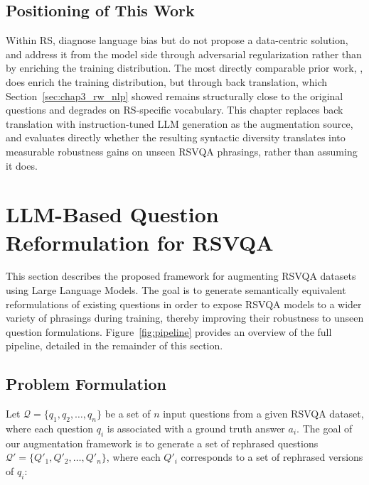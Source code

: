 \subsection{Positioning of This Work}
\label{sec:chap3_positioning}
 
Within RS, \textcite{chappuis2025langbias} diagnose language bias but do not propose a data-centric solution, and \textcite{yuan2023adversarial} address it from the model side through adversarial regularization rather than by enriching the training distribution. The most directly comparable prior work, \textcite{yuan2023multilingual}, does enrich the training distribution, but through back translation, which Section~\ref{sec:chap3_rw_nlp} showed remains structurally close to the original questions and degrades on RS-specific vocabulary. This chapter replaces back translation with instruction-tuned LLM generation as the augmentation source, and evaluates directly whether the resulting syntactic diversity translates into measurable robustness gains on unseen RSVQA phrasings, rather than assuming it does.

\section{LLM-Based Question Reformulation for RSVQA}
\label{sec:chap3_method}
 
This section describes the proposed framework for
augmenting RSVQA datasets using Large Language Models.
The goal is to generate semantically equivalent
reformulations of existing questions in order to expose
RSVQA models to a wider variety of phrasings during
training, thereby improving their robustness to unseen
question formulations. Figure~\ref{fig:pipeline} provides
an overview of the full pipeline, detailed in the
remainder of this section.
 
\subsection{Problem Formulation}
\label{sec:chap3_formulation}
 
Let $\mathcal{Q} = \{q_1, q_2, \ldots, q_n\}$ be a set
of $n$ input questions from a given RSVQA dataset, where
each question $q_i$ is associated with a ground truth
answer $a_i$. The goal of our augmentation framework is
to generate a set of rephrased questions
$\mathcal{Q}' = \{Q'_1, Q'_2, \ldots, Q'_n\}$, where
each $Q'_i$ corresponds to a set of rephrased versions
of $q_i$:
 
